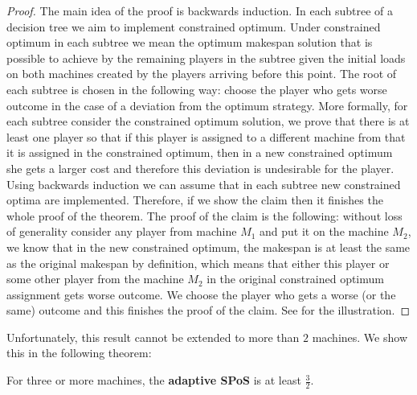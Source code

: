 \documentclass[runningheads]{llncs}
\newcommand{\aSPoS}{\textbf{adaptive SPoS}\xspace}
\begin{document}
\begin{proof}
The main idea of the proof is backwards induction. In each subtree of a decision tree we aim to implement constrained optimum. Under constrained optimum in each subtree we mean the optimum makespan solution that is possible to achieve by the remaining players in the subtree given the initial loads on both machines created by the players arriving before this point. The root of each subtree is chosen in the following way: choose the player who gets worse outcome in the case of a deviation from the optimum strategy. More formally, for each subtree  consider the constrained optimum solution, we prove that there is at least one player so that if this player is assigned to a different machine from that it is assigned in the constrained optimum, then in a new constrained optimum she gets a larger cost and therefore this deviation is undesirable for the player.  Using backwards induction we can assume that in each subtree new constrained optima are implemented. Therefore, if we show the claim then it finishes the whole proof of the theorem. The proof of the claim is the following: without loss of generality consider any player from machine $M_1$ and put it on the machine $M_2$, we know that in the new constrained optimum, the makespan is at least the same as the original makespan by definition, which means that either this player or some other player from the machine $M_2$ in the original constrained optimum assignment gets worse outcome. We choose the player who gets a worse (or the same) outcome and this finishes the proof of the claim. See  for the illustration. 
\end{proof}

Unfortunately, this result cannot be extended to more than $2$ machines. We show this in the following theorem:

\begin{theorem}
For three or more machines, the \aSPoS is at least $\frac{3}{2}$.
\end{theorem}
\end{document}
